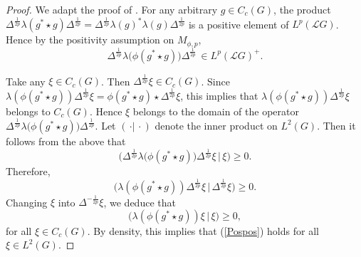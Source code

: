 \documentclass[12pt]{amsart}
\theoremstyle{remark}
\theoremstyle{definition}
\numberwithin{equation}{section}
\begin{document}
\begin{proof}
We adapt the proof of \cite[Lemma 6.10]{AK}. 
For any arbitrary
$g\in C_c(G)$, the product $\Delta^{\frac{1}{2p}}
\lambda(g^* \star g)\Delta^{\frac{1}{2p}}=\Delta^{\frac{1}{2p}}
\lambda(g)^*\lambda(g)\Delta^{\frac{1}{2p}}$
is a positive element of $L^p({\mathcal L}G)$. 
Hence by the positivity assumption on $M_{\phi,p}$, 
$$
\Delta^{\frac{1}{2p}}\lambda\bigl(\phi(g^* \star g)\bigr)\Delta^{\frac{1}{2p}} 
\,\in L^p({\mathcal L}G)^+.
$$





Take any $\xi\in C_c(G)$. 
Then $\Delta^{\frac{1}{2p}}\xi\in C_c(G)$. Since 
$\lambda(\phi(g^* \star g))\Delta^{\frac{1}{2p}}\xi=\phi(g^* \star g)\star \Delta^{\frac{1}{2p}}\xi$,
this implies that $\lambda(\phi(g^* \star g))\Delta^{\frac{1}{2p}}\xi$ belongs 
to $C_c(G)$. Hence $\xi$ belongs to the domain 
of the operator $\Delta^{\frac{1}{2p}}
\lambda\bigl(\phi(g^* \star g)\bigr)\Delta^{\frac{1}{2p}}$.
Let $(\,\cdotp\vert\,\cdotp)$ denote the inner product on $L^2(G)$. 
Then it follows from the above that
$$
\bigl(\Delta^{\frac{1}{2p}}
\lambda\bigl(\phi(g^* \star g)\bigr)\Delta^{\frac{1}{2p}}\xi\,\vert\,\xi\bigr)\geq 0.
$$
Therefore,
$$
\bigl(\lambda(\phi(g^* \star g)) \Delta^{\frac{1}{2p}}\xi\,
\big\vert\,\Delta^{\frac{1}{2p}}\xi\bigr) \geq 0.
$$
Changing $\xi$ into $\Delta^{-\frac{1}{2p}}\xi$,
we deduce that 
\begin{equation}\label{Pospos}
\bigl(\lambda(\phi(g^*\star g)) \xi\,
\big\vert\,\xi\bigr) \geq 0,
\end{equation}
for all $\xi\in C_c(G)$. By density, this implies that (\ref{Pospos}) 
holds for all $\xi\in L^2(G)$.



\end{proof}
\end{document}
